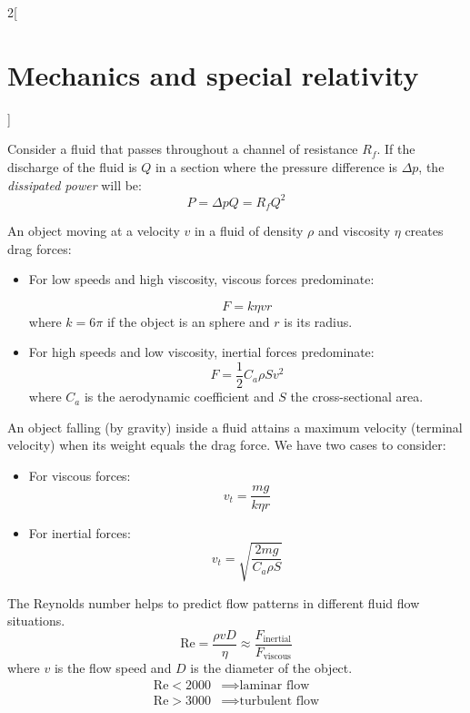 \documentclass[../../../main.tex]{subfiles}
\begin{document}
\begin{multicols}{2}[\section{Mechanics and special relativity}]
    \begin{prop}
        Consider a fluid that passes throughout a channel of resistance $R_f$. If the discharge of the fluid is $Q$ in a section where the pressure difference is $\Delta p$, the \textit{dissipated power} will be:
        $$P=\Delta pQ=R_fQ^2$$
    \end{prop}
    \begin{prop}
        An object moving at a velocity $v$ in a fluid of density $\rho$ and viscosity $\eta$ creates drag forces:
        \begin{itemize}
            \item For low speeds and high viscosity, viscous forces predominate:\par
                  $$F=k\eta vr$$
                  where $k=6\pi$ if the object is an sphere and $r$ is its radius.
            \item For high speeds and low viscosity, inertial forces predominate:
                  $$F=\frac{1}{2}C_a\rho Sv^2$$
                  where $C_a$ is the aerodynamic coefficient and $S$ the cross-sectional area.
        \end{itemize}
    \end{prop}
    \begin{prop}
        An object falling (by gravity) inside a fluid attains a maximum velocity (terminal velocity) when its weight equals the drag force. We have two cases to consider:
        \begin{itemize}
            \item For viscous forces: $$v_t=\frac{mg}{k\eta r}$$
            \item For inertial forces: $$v_t=\sqrt{\frac{2mg}{C_a\rho S}}$$
        \end{itemize}
    \end{prop}
    \begin{prop}
        The Reynolds number helps to predict flow patterns in different fluid flow situations.
        $$\text{Re}=\frac{\rho vD}{\eta}\approx\frac{F_{\text{inertial}}}{F_{\text{viscous}}}$$
        where $v$ is the flow speed and $D$ is the diameter of the object.
        \begin{align*}
            \text{Re}<2000 & \implies\text{laminar flow}   \\
            \text{Re}>3000 & \implies\text{turbulent flow}
        \end{align*}
    \end{prop}


\end{multicols}
\end{document}
